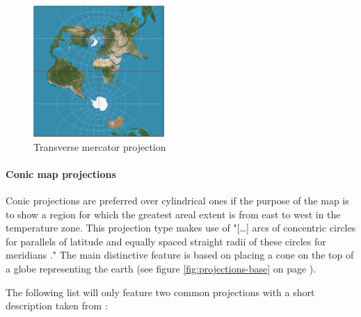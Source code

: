 \begin{enumerate}
\begin{figure}[!htb]
\centering
\includegraphics[height=5cm,keepaspectratio]{images/methods/projections/mercator-transverse.png}
\caption[
    Transverse mercator projection, Urldate: 07.2016 \newline
    \small\texttt{\url{https://upload.wikimedia.org/wikipedia/commons/1/15/MercTranSph.png}}.
]{Transverse mercator projection}
\label{fig:projections-mercator-transverse}
\end{figure}

\end{enumerate}

\paragraph{Conic map projections}
Conic projections are preferred over cylindrical ones if the purpose of the map is to show a region for which the greatest areal extent is from east to west in the temperature zone. This projection type makes use of "[\ldots] arcs of concentric circles for parallels of latitude and equally spaced straight radii of these circles for meridians ." The main distinctive feature is based on placing a cone on the top of a globe representing the earth (see figure \ref{fig:projections-base} on page \pageref{fig:projections-base}).

The following list will only feature two common projections with a short description taken from \citeauthor{Snyder1987} :

